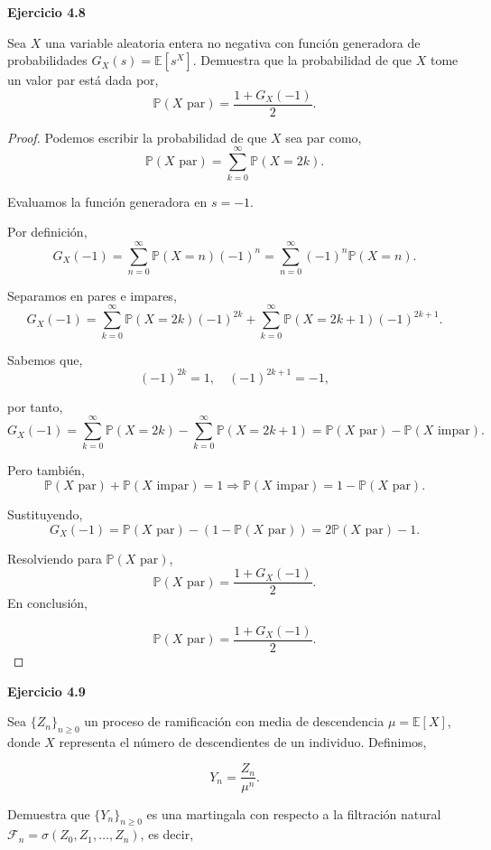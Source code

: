 \documentclass{article}
\begin{document}

\textbf{Ejercicio 4.8}

 Sea \( X \) una variable aleatoria entera no negativa con función generadora de probabilidades \( G_X(s) = \mathbb{E}[s^X] \). Demuestra que la probabilidad de que \( X \) tome un valor par está dada por,
\[
\mathbb{P}(X \text{ par}) = \frac{1 + G_X(-1)}{2}.
\]

\begin{proof}
Podemos escribir la probabilidad de que \( X \) sea par como,
\[
\mathbb{P}(X \text{ par}) = \sum_{k=0}^{\infty} \mathbb{P}(X = 2k).
\]

Evaluamos la función generadora en \( s = -1 \).

Por definición,
\[
G_X(-1) = \sum_{n=0}^{\infty} \mathbb{P}(X = n)(-1)^n
= \sum_{n=0}^{\infty} (-1)^n \mathbb{P}(X = n).
\]

Separamos en pares e impares,
\[
G_X(-1) = \sum_{k=0}^{\infty} \mathbb{P}(X = 2k)(-1)^{2k}
+ \sum_{k=0}^{\infty} \mathbb{P}(X = 2k + 1)(-1)^{2k+1}.
\]

Sabemos que,
\[
(-1)^{2k} = 1, \quad (-1)^{2k + 1} = -1,
\]

por tanto,
\[
G_X(-1) = \sum_{k=0}^{\infty} \mathbb{P}(X = 2k)
- \sum_{k=0}^{\infty} \mathbb{P}(X = 2k + 1)
= \mathbb{P}(X \text{ par}) - \mathbb{P}(X \text{ impar}).
\]

Pero también,
\[
\mathbb{P}(X \text{ par}) + \mathbb{P}(X \text{ impar}) = 1
\Rightarrow \mathbb{P}(X \text{ impar}) = 1 - \mathbb{P}(X \text{ par}).
\]

Sustituyendo,
\[
G_X(-1) = \mathbb{P}(X \text{ par}) - (1 - \mathbb{P}(X \text{ par})) = 2 \mathbb{P}(X \text{ par}) - 1.
\]

Resolviendo para \( \mathbb{P}(X \text{ par}) \),
\[
\mathbb{P}(X \text{ par}) = \frac{1 + G_X(-1)}{2}.
\]
En conclusión,

\[
\mathbb{P}(X \text{ par}) = \frac{1 + G_X(-1)}{2}.
\]
\end{proof}

\textbf{Ejercicio 4.9}

Sea $\{Z_n\}_{n \geq 0}$ un proceso de ramificación con media de descendencia $\mu = \mathbb{E}[X]$, donde $X$ representa el número de descendientes de un individuo. Definimos,

\[
Y_n = \frac{Z_n}{\mu^n}.
\]

Demuestra que $\{Y_n\}_{n \geq 0}$ es una martingala con respecto a la filtración natural $\mathcal{F}_n = \sigma(Z_0, Z_1, \dots, Z_n)$, es decir,
\end{document}

